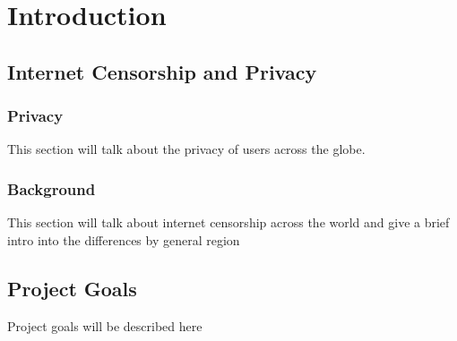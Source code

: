 \chapter{Introduction}
\section{Internet Censorship and Privacy}

\subsection{Privacy}
This section will talk about the privacy of users across the globe.

\subsection{Background}

This section will talk about internet censorship across the world and give a brief intro into the differences by general region

\section{Project Goals}

Project goals will be described here